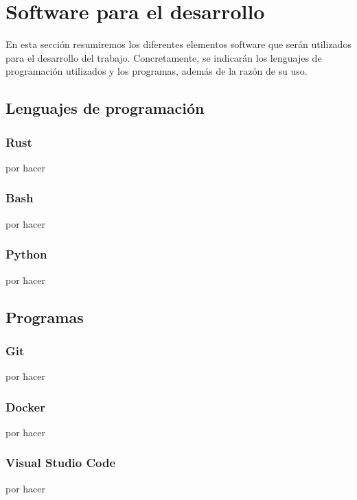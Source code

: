 \section{Software para el desarrollo}

En esta sección resumiremos los diferentes elementos software que serán utilizados para el desarrollo del trabajo. Concretamente, se indicarán los lenguajes de programación utilizados y los programas, además de la razón de su uso.

\subsection{Lenguajes de programación}

\subsubsection{Rust}

por hacer

\subsubsection{Bash}

por hacer

\subsubsection{Python}

por hacer


\subsection{Programas}

\subsubsection{Git}

por hacer

\subsubsection{Docker}

por hacer

\subsubsection{Visual Studio Code}

por hacer
